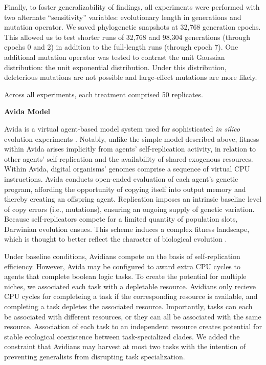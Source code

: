 Finally, to foster generalizability of findings, all experiments were performed with two alternate ``sensitivity'' variables: evolutionary length in generations and mutation operator.
We saved phylogenetic snapshots at 32,768 generation epochs.
This allowed us to test shorter runs of 32,768 and 98,304 generations (through epochs 0 and 2) in addition to the full-length runs (through epoch 7).
One additional mutation operator was tested to contrast the unit Gaussian distribution: the unit exponential distribution.
Under this distribution, deleterious mutations are not possible and large-effect mutations are more likely.

Across all experiments, each treatment comprised 50 replicates.

\textbf{Avida Model}

Avida is a virtual agent-based model system used for sophisticated \textit{in silico} evolution experiments \citep{ofria2004avida}.
Notably, unlike the simple model described above, fitness within Avida arises implicitly from agents' self-replication activity, in relation to other agents' self-replication and the availability of shared exogenous resources.
Within Avida, digital organisms' genomes comprise a sequence of virtual CPU instructions.
Avida conducts open-ended evaluation of each agent's genetic program, affording the opportunity of copying itself into output memory and thereby creating an offspring agent.
Replication imposes an intrinsic baseline level of copy errors (i.e., mutations), ensuring an ongoing supply of genetic variation.
Because self-replicators compete for a limited quantity of population slots, Darwinian evolution ensues.
This scheme induces a complex fitness landscape, which is thought to better reflect the character of biological evolution \citep{adami2006digital}.

Under baseline conditions, Avidians compete on the basis of self-replication efficiency.
However, Avida may be configured to award extra CPU cycles to agents that complete boolean logic tasks.
To create the potential for multiple niches, we associated each task with a depletable resource.
Avidians only recieve CPU cycles for completeing a task if the corresponding resource is available, and completing a task depletes the associated resource.
Importantly, tasks can each be associated with different resources, or they can all be associated with the same resource.
Association of each task to an independent resource creates potential for stable ecological coexistence between task-specialized clades.
We added the constraint that Avidians may harvest at most two tasks with the intention of preventing generalists from disrupting task specialization.

